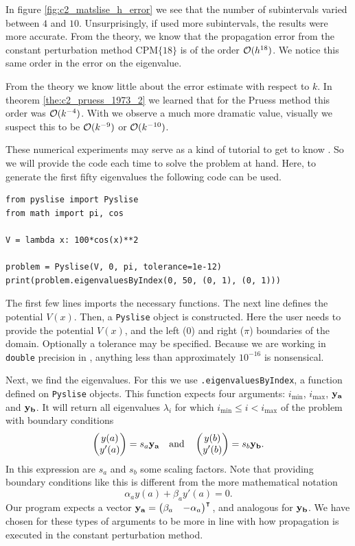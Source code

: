 In figure \ref{fig:c2_matslise_h_error} we see that the number of subintervals varied between $4$ and $10$. Unsurprisingly, if \matslise{} used more subintervals, the results were more accurate. From the theory, we know that the propagation error from the constant perturbation method $\text{CPM}\{18\}$ is of the order $\operatorname{\mathcal{O}}(h^{18})$. We notice this same order in the error on the eigenvalue.

From the theory we know little about the error estimate with respect to $k$. In theorem \ref{the:c2_pruess_1973_2} we learned that for the Pruess method this order was $\operatorname{\mathcal{O}}(k^{-4})$. With \matslise{} we observe a much more dramatic value, visually we suspect this to be $\operatorname{\mathcal{O}}(k^{-9})$ or $\operatorname{\mathcal{O}}(k^{-10})$.

These numerical experiments may serve as a kind of tutorial to get to know \pyslise{}. So we will provide the code each time to solve the problem at hand. Here, to generate the first fifty eigenvalues the following code can be used.
\begin{verbatim}
from pyslise import Pyslise
from math import pi, cos

V = lambda x: 100*cos(x)**2

problem = Pyslise(V, 0, pi, tolerance=1e-12)
print(problem.eigenvaluesByIndex(0, 50, (0, 1), (0, 1)))
\end{verbatim}

The first few lines imports the necessary functions. The next line defines the potential $V(x)$. Then, a \texttt{Pyslise} object is constructed. Here the user needs to provide the potential $V(x)$, and the left ($0$) and right ($\pi$) boundaries of the domain. Optionally a tolerance may be specified. Because we are working in \texttt{double} precision in \lpython{}, anything less than approximately $10^{-16}$ is nonsensical.

Next, we find the eigenvalues. For this we use \texttt{.eigenvaluesByIndex}, a function defined on \texttt{Pyslise} objects. This function expects four arguments: $i_\text{min}$, $i_\text{max}$, $\vb{y_a}$ and $\vb{y_b}$. It will return all eigenvalues $\lambda_i$ for which $i_\text{min} \leq i < i_\text{max}$ of the problem with boundary conditions
$$
    \begin{pmatrix}y(a) \\ y'(a)\end{pmatrix} = s_a \vb{y_a} \quad\text{and}\quad \begin{pmatrix}y(b) \\ y'(b)\end{pmatrix} = s_b \vb{y_b}\text{.}
$$
In this expression are $s_a$ and $s_b$ some scaling factors. Note that providing boundary conditions like this is different from the more mathematical notation
$$
    \alpha_a y(a) + \beta_a y'(a) = 0\text{.}
$$
Our program expects a vector $\vb{y_a} = \begin{pmatrix}\beta_a & - \alpha_a\end{pmatrix}^\intercal{}$, and analogous for $\vb{y_b}$. We have chosen for these types of arguments to be more in line with how propagation is executed in the constant perturbation method.

